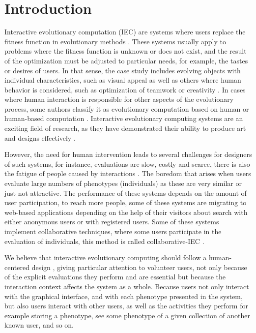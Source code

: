 \chapter{Introduction} \label{introduction}


\par Interactive evolutionary computation (IEC) are systems where users replace the
fitness function in evolutionary methods \cite{eiben2015introduction}.
These systems usually apply to problems
where the fitness function is unknown or does not exist, and the result of the
optimization must be adjusted to particular needs, for example, the tastes or
desires of users. In that sense, the case study includes evolving objects
with individual characteristics, such as visual appeal as well as others where
human behavior is considered, such as optimization of teamwork
\cite{kosorukoff2002evolutionary} or creativity \cite{yu2011cooks}. In cases
where human interaction is   responsible for other aspects of the evolutionary
process, some authors classify it as evolutionary computation based on human
\cite{kosorukoff2001human} or human-based computation \cite{quinn2011human}.
Interactive evolutionary computing systems are an exciting field of research, as
they have demonstrated their ability to produce art and designs effectively
\cite{bentley1999introduction, kowaliw2012promoting, sims1991artificial,
todd1994evolutionary}.

\par However, the need for human intervention leads to several challenges for
designers of such systems, for instance, evaluations are slow, costly and
scarce, there is also the fatigue of people caused by interactions
\cite{takagi1998interactive}. The boredom that arises when users evaluate large
numbers of phenotypes (individuals) as these are very similar or just not attractive. The
performance of these systems depends on the amount of user participation, to
reach more people, some of these systems are migrating to web-based applications
depending on the help of their visitors about search with either anonymous users
or with registered users. Some of these systems implement collaborative
techniques, where some users participate in the evaluation of individuals, this
method is called collaborative-IEC \cite{secretan2008picbreeder,
seyama2016development, wagy2014collective}.

\par We believe that interactive evolutionary computing should follow a human-centered
design \cite{greenhouse2012human}, giving particular attention to volunteer
users, not only because of the explicit evaluations they perform and are
essential but because the interaction context affects the system as a whole.
Because users not only interact with the graphical interface, and with each
phenotype presented in the system, but also users interact with other users, as
well as the activities they perform for example storing a phenotype, see some
phenotype of a given collection of another known user, and so on.

